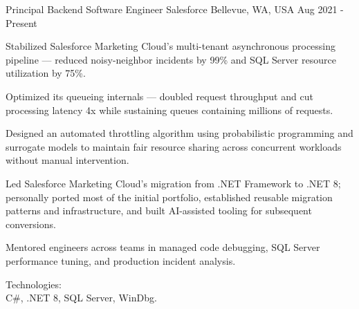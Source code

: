 
\begin{cventries}

\cventry
{Principal Backend Software Engineer} %
{Salesforce} %
{Bellevue, WA, USA} %
{Aug 2021 - Present} %
{
  \begin{cvitems} %
    \item
    {
      Stabilized Salesforce Marketing Cloud's multi-tenant asynchronous processing pipeline --- reduced noisy-neighbor incidents by 99\% and SQL Server resource utilization by 75\%.
    }
    \item
    {
      Optimized its queueing internals --- doubled request throughput and cut processing latency 4x while sustaining queues containing millions of requests.
    }
    \item
    {
      Designed an automated throttling algorithm using probabilistic programming and surrogate models to maintain fair resource sharing across concurrent workloads without manual intervention.
    }
    \item
    {
      Led Salesforce Marketing Cloud's migration from .NET Framework to .NET 8; personally ported most of the initial portfolio, established reusable migration patterns and infrastructure, and built AI-assisted tooling for subsequent conversions.
    }
    \item
    {
      Mentored engineers across teams in managed code debugging, SQL Server performance tuning, and production incident analysis.
    }
    \item
    {
      Technologies:\\
      {C\#}, .NET 8, SQL Server, WinDbg.\\
    }
  \end{cvitems}
}
\vspace{3mm}


\end{cventries}
